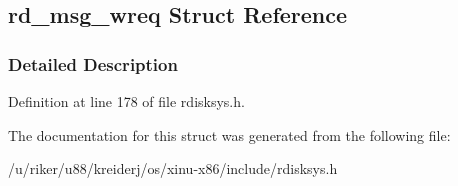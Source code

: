\hypertarget{structrd__msg__wreq}{}\subsection{rd\+\_\+msg\+\_\+wreq Struct Reference}
\label{structrd__msg__wreq}


\subsubsection{Detailed Description}


Definition at line 178 of file rdisksys.\+h.



The documentation for this struct was generated from the following file\+:\begin{DoxyCompactItemize}
\item 
/u/riker/u88/kreiderj/os/xinu-\/x86/include/rdisksys.\+h\end{DoxyCompactItemize}
